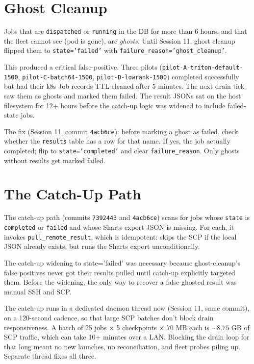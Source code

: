 \documentclass[11pt,openany]{book}
\theoremstyle{definition}
\theoremstyle{plain}
\begin{document}
\section{Ghost Cleanup}

Jobs that are \texttt{dispatched} or \texttt{running} in the DB for
more than 6 hours, and that the fleet cannot see (pod is gone), are
\emph{ghosts}. Until Session 11, ghost cleanup flipped them to
\texttt{state='failed'} with \texttt{failure\_reason='ghost\_cleanup'}.

This produced a critical false-positive. Three pilots
(\texttt{pilot-A-triton-default-1500},
\texttt{pilot-C-batch64-1500},
\texttt{pilot-D-lowrank-1500}) completed successfully but had their
k8s Job records TTL-cleaned after 5 minutes. The next drain tick saw
them as ghosts and marked them failed. The result JSONs sat on the
host filesystem for 12+ hours before the catch-up logic was widened
to include failed-state jobs.

The fix (Session 11, commit \texttt{4acb6ce}): before marking a ghost
as failed, check whether the \texttt{results} table has a row for that
name. If yes, the job actually completed; flip to \texttt{state='completed'}
and clear \texttt{failure\_reason}. Only ghosts without results get
marked failed.

\section{The Catch-Up Path}

The catch-up path (commits \texttt{7392443} and \texttt{4acb6ce}) scans
for jobs whose \texttt{state} is \texttt{completed} or \texttt{failed}
and whose Sharts export JSON is missing. For each, it invokes
\texttt{pull\_remote\_result}, which is idempotent: skips the SCP if
the local JSON already exists, but runs the Sharts export unconditionally.

The catch-up widening to state='failed' was necessary because
ghost-cleanup's false positives never got their results pulled until
catch-up explicitly targeted them. Before the widening, the only way to
recover a false-ghosted result was manual SSH and SCP.

The catch-up runs in a dedicated daemon thread now (Session 11, same
commit), on a 120-second cadence, so that large SCP batches don't block
drain responsiveness. A batch of 25 jobs $\times$ 5 checkpoints $\times$
70 MB each is $\sim 8.75$ GB of SCP traffic, which can take 10+ minutes
over a LAN. Blocking the drain loop for that long meant no new launches,
no reconciliation, and fleet probes piling up. Separate thread fixes all
three.
\end{document}
